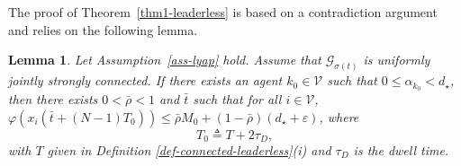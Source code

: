 \documentclass[a4paper, 11pt]{article}
\def \defn{\triangleq}
\newtheorem{lemma}{Lemma}
\begin{document}
The proof of Theorem~\ref{thm1-leaderless} is based on a contradiction argument and
relies on the following lemma.
\begin{lemma}\label{lem1-thm1}
Let Assumption~\ref{ass-lyap} hold. Assume that $\mathcal{G}_{\sigma(t)}$ is uniformly jointly strongly connected.
If there exists an agent $k_0 \in \mathcal{V}$ such that
$0 \leq \alpha_{k_0}< d_\star$, then there exists $0<\bar{\rho}<1$ and $\bar{t}$ such that for all $i \in \mathcal{V}$,
$\varphi(x_i(\bar{t}+(N-1)T_0)) \leq \bar{\rho}M_0+(1-\bar{\rho})(d_\star+\varepsilon)$, where
\begin{equation}\label{defn-T0}
T_0 \defn T+2\tau_D,
\end{equation}
with $T$ given in Definition \ref{def-connected-leaderless}(i) and $\tau_D$ is the dwell time.
\end{lemma}
\end{document}
